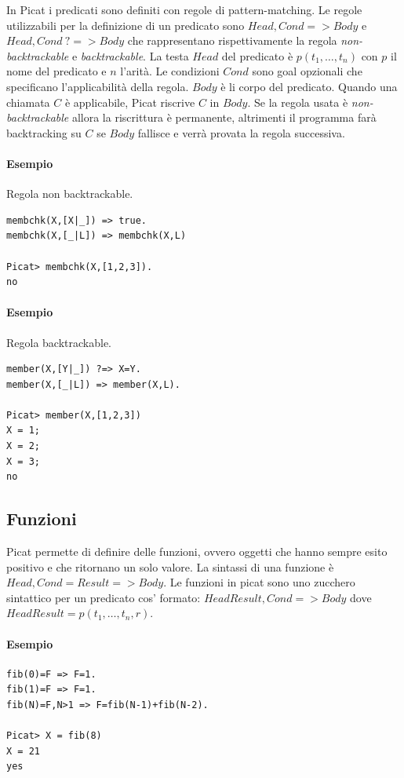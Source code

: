 \documentclass[12pt,a4paper,openright]{book} %
\begin{document}
In Picat i predicati sono definiti con regole di pattern-matching. Le regole utilizzabili per la definizione di un predicato sono $Head, Cond => Body$ e $Head, Cond\ ?=> Body$ che rappresentano rispettivamente la regola \emph{non-backtrackable} e \emph{backtrackable}. La testa $Head$ del predicato è $p(t_1, \ldots, t_n)$ con $p$ il nome del predicato e $n$ l'arità. Le condizioni $Cond$ sono goal opzionali che specificano l'applicabilità della regola. $Body$ è li corpo del predicato.
Quando una chiamata $C$ è applicabile, Picat riscrive $C$ in $Body$. Se la regola usata è \emph{non-backtrackable} allora la riscrittura è permanente, altrimenti il programma farà backtracking su $C$ se $Body$ fallisce e verrà provata la regola successiva.



\paragraph{Esempio} Regola non backtrackable.
\begin{verbatim}
membchk(X,[X|_]) => true.
membchk(X,[_|L]) => membchk(X,L)

Picat> membchk(X,[1,2,3]).
no
\end{verbatim}

\paragraph{Esempio} Regola backtrackable.
\begin{verbatim}
member(X,[Y|_]) ?=> X=Y.
member(X,[_|L]) => member(X,L).

Picat> member(X,[1,2,3])
X = 1;
X = 2;
X = 3;
no
\end{verbatim}

\subsection{Funzioni}
\label{sec:picat_base_func}

Picat permette di definire delle funzioni, ovvero oggetti che hanno sempre esito positivo e che ritornano un solo valore. La sintassi di una funzione è $Head, Cond = Result => Body$. Le funzioni in picat sono uno zucchero sintattico per un predicato cos' formato: $HeadResult, Cond => Body$ dove $HeadResult = p(t_1, \ldots, t_n, r)$.

\paragraph{Esempio}
\begin{verbatim}
fib(0)=F => F=1.
fib(1)=F => F=1.
fib(N)=F,N>1 => F=fib(N-1)+fib(N-2).

Picat> X = fib(8) 
X = 21
yes
\end{verbatim}
\end{document}
